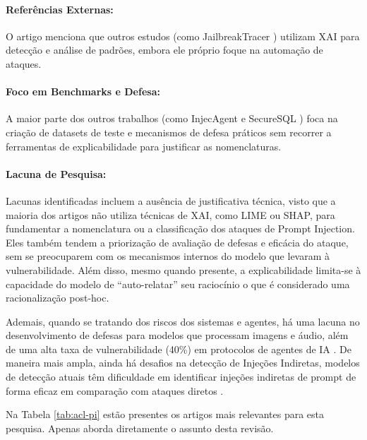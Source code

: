 \paragraph{Referências Externas:} O artigo \textcite{ding2024wolf} menciona que outros estudos (como JailbreakTracer \parencite{sayeedi2025jailbreaktracer}) utilizam XAI para detecção e análise de padrões, embora ele próprio foque na automação de ataques.

\paragraph{Foco em Benchmarks e Defesa:} A maior parte dos outros trabalhos (como InjecAgent \parencite{zhan2024injecagent} e SecureSQL \parencite{song2024securesql}) foca na criação de datasets de teste e mecanismos de defesa práticos sem recorrer a ferramentas de explicabilidade para justificar as nomenclaturas.

\paragraph{Lacuna de Pesquisa: } Lacunas identificadas incluem a ausência de justificativa técnica, visto que a maioria dos artigos não utiliza técnicas de XAI, como LIME ou SHAP, para fundamentar a nomenclatura ou a classificação dos ataques de Prompt Injection. Eles também tendem a priorização de avaliação de defesas e eficácia do ataque, sem se preocuparem com os mecanismos internos do modelo que levaram à vulnerabilidade. Além disso, mesmo quando presente, a explicabilidade limita-se à capacidade do modelo de ``auto-relatar'' seu raciocínio o que é considerado uma racionalização post-hoc. 

Ademais, quando se tratando dos riscos dos sistemas e agentes, há uma lacuna no desenvolvimento de defesas para modelos que processam imagens e áudio, além de uma alta taxa de vulnerabilidade (40\%) em protocolos de agentes de IA \parencite{yan2024backdooring, xu2024preemptive}. De maneira mais ampla, ainda há desafios na detecção de Injeções Indiretas, modelos de detecção atuais têm dificuldade em identificar injeções indiretas de prompt de forma eficaz em comparação com ataques diretos \parencite{nakash2025breaking}.

\vspace{0.5cm}

Na Tabela \ref{tab:acl-pi} estão presentes os artigos mais relevantes para esta pesquisa. Apenas \textcite{hung2025attention} aborda diretamente o assunto desta revisão.

